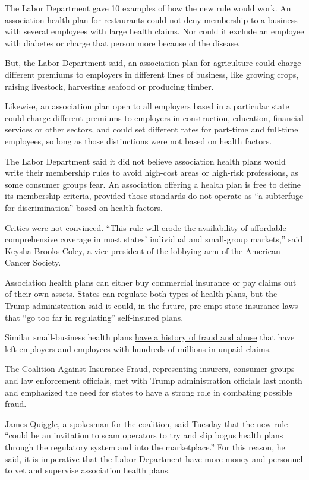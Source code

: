 The Labor Department gave 10 examples of how the new rule would work. An
association health plan for restaurants could not deny membership to a
business with several employees with large health claims. Nor could it
exclude an employee with diabetes or charge that person more because of
the disease.

But, the Labor Department said, an association plan for agriculture
could charge different premiums to employers in different lines of
business, like growing crops, raising livestock, harvesting seafood or
producing timber.

Likewise, an association plan open to all employers based in a
particular state could charge different premiums to employers in
construction, education, financial services or other sectors, and could
set different rates for part-time and full-time employees, so long as
those distinctions were not based on health factors.

The Labor Department said it did not believe association health plans
would write their membership rules to avoid high-cost areas or high-risk
professions, as some consumer groups fear. An association offering a
health plan is free to define its membership criteria, provided those
standards do not operate as ``a subterfuge for discrimination'' based on
health factors.

Critics were not convinced. ``This rule will erode the availability of
affordable comprehensive coverage in most states' individual and
small-group markets,'' said Keysha Brooks-Coley, a vice president of the
lobbying arm of the American Cancer Society.

Association health plans can either buy commercial insurance or pay
claims out of their own assets. States can regulate both types of health
plans, but the Trump administration said it could, in the future,
pre-empt state insurance laws that ``go too far in regulating''
self-insured plans.

Similar small-business health plans
\href{https://www.nytimes3xbfgragh.onion/2017/10/21/us/politics/trump-association-health-plans-fraud.html}{have
a history of fraud and abuse} that have left employers and employees
with hundreds of millions in unpaid claims.

The Coalition Against Insurance Fraud, representing insurers, consumer
groups and law enforcement officials, met with Trump administration
officials last month and emphasized the need for states to have a strong
role in combating possible fraud.

James Quiggle, a spokesman for the coalition, said Tuesday that the new
rule ``could be an invitation to scam operators to try and slip bogus
health plans through the regulatory system and into the marketplace.''
For this reason, he said, it is imperative that the Labor Department
have more money and personnel to vet and supervise association health
plans.

